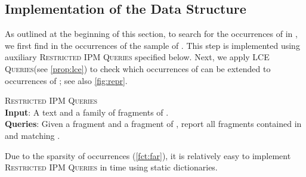 \documentclass[a4paper]{article}
\theoremstyle{definition}
\theoremstyle{remark}
\newcommand{\RIPM}{\textsc{Restricted IPM Queries}\xspace}
\newcommand{\LCEQ}{\textsc{LCE Queries}\xspace}
\newenvironment{dsproblem}[1]
{\begin{center}\begin{lrbox}{\mybox}\begin{minipage}{0.96\columnwidth}{\textsc{#1}}\\}
{\end{minipage}\end{lrbox}\fbox{\usebox{\mybox}}\end{center}}
\newcommand{\defdsproblem}[2]{
  \begin{dsproblem}{#1}
#2
  \end{dsproblem}
  }
\begin{document}
\subsection{Implementation of the Data Structure}\label{sec:impl}
As outlined at the beginning of this section, to search for the occurrences of  in , we first find
in  the  occurrences of the sample  of .
This step is implemented using auxiliary \RIPM specified below.
Next, we apply \LCEQ (see \cref{prop:lce}) to check which occurrences of  can be extended to occurrences of ;
see also \cref{fig:repr}.

\defdsproblem{\RIPM}{
\textbf{Input}: A text  and a family  of fragments of .\\
\textbf{Queries}: Given a fragment  and a fragment  of , report all fragments 
contained in  and matching .
}

Due to the sparsity of occurrences (\cref{fct:far}),
it is relatively easy to implement \RIPM in  time using static dictionaries.
\end{document}
